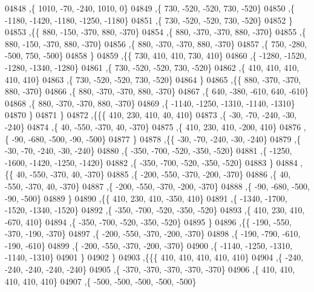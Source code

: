 \begin{DoxyCode}
04848     ,\{  1010,   -70,  -240,  1010,     0\}
04849     ,\{   730,  -520,  -520,   730,  -520\}
04850     ,\{ -1180, -1420, -1180, -1250, -1180\}
04851     ,\{   730,  -520,  -520,   730,  -520\}
04852     \}
04853    ,\{\{   880,  -150,  -370,   880,  -370\}
04854     ,\{   880,  -370,  -370,   880,  -370\}
04855     ,\{   880,  -150,  -370,   880,  -370\}
04856     ,\{   880,  -370,  -370,   880,  -370\}
04857     ,\{   750,  -280,  -500,   750,  -500\}
04858     \}
04859    ,\{\{   730,   410,   410,   730,   410\}
04860     ,\{ -1280, -1520, -1280, -1340, -1280\}
04861     ,\{   730,  -520,  -520,   730,  -520\}
04862     ,\{   410,   410,   410,   410,   410\}
04863     ,\{   730,  -520,  -520,   730,  -520\}
04864     \}
04865    ,\{\{   880,  -370,  -370,   880,  -370\}
04866     ,\{   880,  -370,  -370,   880,  -370\}
04867     ,\{   640,  -380,  -610,   640,  -610\}
04868     ,\{   880,  -370,  -370,   880,  -370\}
04869     ,\{ -1140, -1250, -1310, -1140, -1310\}
04870     \}
04871    \}
04872   ,\{\{\{   410,   230,   410,    40,   410\}
04873     ,\{   -30,   -70,  -240,   -30,  -240\}
04874     ,\{    40,  -550,  -370,    40,  -370\}
04875     ,\{   410,   230,   410,  -200,   410\}
04876     ,\{   -90,  -680,  -500,   -90,  -500\}
04877     \}
04878    ,\{\{   -30,   -70,  -240,   -30,  -240\}
04879     ,\{   -30,   -70,  -240,   -30,  -240\}
04880     ,\{  -350,  -700,  -520,  -350,  -520\}
04881     ,\{ -1250, -1600, -1420, -1250, -1420\}
04882     ,\{  -350,  -700,  -520,  -350,  -520\}
04883     \}
04884    ,\{\{    40,  -550,  -370,    40,  -370\}
04885     ,\{  -200,  -550,  -370,  -200,  -370\}
04886     ,\{    40,  -550,  -370,    40,  -370\}
04887     ,\{  -200,  -550,  -370,  -200,  -370\}
04888     ,\{   -90,  -680,  -500,   -90,  -500\}
04889     \}
04890    ,\{\{   410,   230,   410,  -350,   410\}
04891     ,\{ -1340, -1700, -1520, -1340, -1520\}
04892     ,\{  -350,  -700,  -520,  -350,  -520\}
04893     ,\{   410,   230,   410,  -670,   410\}
04894     ,\{  -350,  -700,  -520,  -350,  -520\}
04895     \}
04896    ,\{\{  -190,  -550,  -370,  -190,  -370\}
04897     ,\{  -200,  -550,  -370,  -200,  -370\}
04898     ,\{  -190,  -790,  -610,  -190,  -610\}
04899     ,\{  -200,  -550,  -370,  -200,  -370\}
04900     ,\{ -1140, -1250, -1310, -1140, -1310\}
04901     \}
04902    \}
04903   ,\{\{\{   410,   410,   410,   410,   410\}
04904     ,\{  -240,  -240,  -240,  -240,  -240\}
04905     ,\{  -370,  -370,  -370,  -370,  -370\}
04906     ,\{   410,   410,   410,   410,   410\}
04907     ,\{  -500,  -500,  -500,  -500,  -500\}

\end{DoxyCode}
